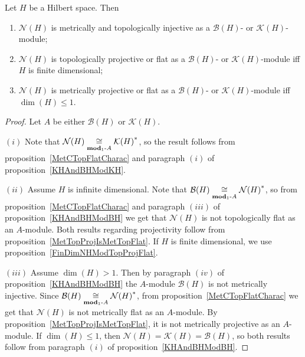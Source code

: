\begin{proposition}\label{KHAndBHModNH} Let $H$ be a Hilbert space. Then

\begin{enumerate}[label = (\roman*)]
    \item $\mathcal{N}(H)$ is metrically and topologically injective as
    a $\mathcal{B}(H)$- or $\mathcal{K}(H)$-module;

    \item $\mathcal{N}(H)$ is topologically projective or flat 
    as a $\mathcal{B}(H)$- or $\mathcal{K}(H)$-module 
    iff $H$ is finite dimensional;

    \item $\mathcal{N}(H)$ is metrically projective or flat 
    as a $\mathcal{B}(H)$- or $\mathcal{K}(H)$-module iff $\dim(H)\leq 1$.
\end{enumerate}
\end{proposition}
\begin{proof} Let $A$ be either $\mathcal{B}(H)$ or $\mathcal{K}(H)$.

$(i)$ Note that $\mathcal{N}(H)\mathrel{\mathop{\cong}\limits_{\mathbf{mod}_1\text{-}A}}{\mathcal{K}(H)}^*$, 
so the result follows from proposition~\ref{MetCTopFlatCharac} and 
paragraph $(i)$ of proposition~\ref{KHAndBHModKH}.

$(ii)$ Assume $H$ is infinite dimensional. Note that
$\mathcal{B}(H)\mathrel{\mathop{\cong}\limits_{\mathbf{mod}_1\text{-}A}}{\mathcal{N}(H)}^*$, so from
proposition~\ref{MetCTopFlatCharac} and paragraph $(iii)$ of
proposition~\ref{KHAndBHModBH} we get that $\mathcal{N}(H)$ is not topologically
flat as an $A$-module. Both results regarding projectivity follow from
proposition~\ref{MetTopProjIsMetTopFlat}. If $H$ is finite dimensional, we use
proposition~\ref{FinDimNHModTopProjFlat}.

$(iii)$ Assume $\dim(H)>1$. Then by paragraph $(iv)$ of
proposition~\ref{KHAndBHModBH} the $A$-module $\mathcal{B}(H)$ is not metrically
injective. Since $\mathcal{B}(H)\mathrel{\mathop{\cong}\limits_{\mathbf{mod}_1\text{-}A}}{\mathcal{N}(H)}^*$,
from proposition~\ref{MetCTopFlatCharac} we get that $\mathcal{N}(H)$ is not
metrically flat as an $A$-module. By proposition~\ref{MetTopProjIsMetTopFlat}, it
is not metrically projective as an $A$-module. If $\dim(H)\leq 1$, then
$\mathcal{N}(H)=\mathcal{K}(H)=\mathcal{B}(H)$, so both results follow from
paragraph $(i)$ of proposition~\ref{KHAndBHModBH}.
\end{proof}

